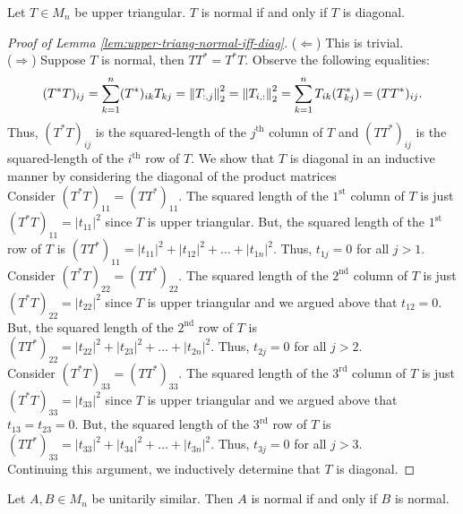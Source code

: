 \begin{lemma}
\label{lem:upper-triang-normal-iff-diag}
Let $T \in M_n$ be upper triangular. $T$ is normal if and only if $T$ is diagonal.
\end{lemma}

\begin{proof}[Proof of Lemma \ref{lem:upper-triang-normal-iff-diag}]
($\Longleftarrow$) This is trivial. \\

\noindent ($\Longrightarrow$) Suppose $T$ is normal, then $TT^* = T^*T$. Observe the following equalities:
$$
(T^*T)_{ij} = \sum_{k=1}^{n} (T^*)_{ik}T_{kj} = \left\lVert T_{:, j}\right\rVert_2^2 = \left\lVert T_{i, :}\right\rVert_2^2 = \sum_{k=1}^n T_{ik}(T^*_{kj}) = (TT^*)_{ij}.
$$
Thus, $(T^*T)_{ij}$ is the squared-length of the $j^{\text{th}}$ column of $T$ and  $(TT^*)_{ij}$ is the squared-length of the $i^{\text{th}}$ row of $T$. We show that $T$ is diagonal in an inductive manner by considering the diagonal of the product matrices \\

\noindent Consider $(T^*T)_{11} = (TT^*)_{11}$. The squared length of the $ 1^{\text{st}}$ column of $T$ is just $(T^*T)_{11} = |t_{11}|^2$ since $T$ is upper triangular. But, the squared length of the $1^{\text{st}}$ row of $T$ is $(TT^*)_{11} = |t_{11}|^2 + |t_{12}|^2 + \dots + |t_{1n}|^2$. Thus, $t_{1j} = 0$ for all $j > 1$. \\

\noindent Consider $(T^*T)_{22} = (TT^*)_{22}$. The squared length of the $ 2^{\text{nd}}$ column of $T$ is just $(T^*T)_{22} = |t_{22}|^2$ since $T$ is upper triangular and we argued above that $t_{12} = 0$. But, the squared length of the $2^{\text{nd}}$ row of $T$ is $(TT^*)_{22} = |t_{22}|^2 + |t_{23}|^2 + \dots + |t_{2n}|^2$. Thus, $t_{2j} = 0$ for all $j > 2$. \\

\noindent Consider $(T^*T)_{33} = (TT^*)_{33}$. The squared length of the $ 3^{\text{rd}}$ column of $T$ is just $(T^*T)_{33} = |t_{33}|^2$ since $T$ is upper triangular and we argued above that $t_{13} = t_{23} = 0$. But, the squared length of the $3^{\text{rd}}$ row of $T$ is $(TT^*)_{33} = |t_{33}|^2 + |t_{34}|^2 + \dots + |t_{3n}|^2$. Thus, $t_{3j} = 0$ for all $j > 3$. \\

\noindent Continuing this argument, we inductively determine that $T$ is diagonal.
\end{proof}

\begin{lemma}
\label{lem:unitarily-similar-matrices-normal}
Let $A, B \in M_n$ be unitarily similar. Then $A$ is normal if and only if $B$ is normal.
\end{lemma}

